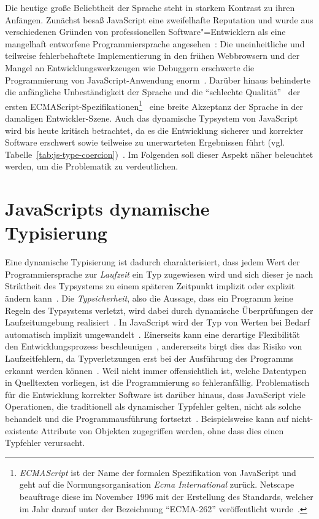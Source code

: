 Die heutige große Beliebtheit der Sprache steht in starkem Kontrast zu ihren Anfängen. Zunächst besaß JavaScript eine zweifelhafte Reputation und wurde aus verschiedenen Gründen von professionellen Software"=Entwicklern als eine mangelhaft entworfene Programmiersprache angesehen~\autocite{CROCKFORD:JS_POPULAR}: Die uneinheitliche und teilweise fehlerbehaftete Implementierung in den frühen Webbrowsern und der Mangel an Entwicklungswerkzeugen wie Debuggern erschwerte die Programmierung von JavaScript-Anwendung enorm~\autocite{OREILLY:JS_HOW_DID_WE_GET_THERE}. Darüber hinaus behinderte die anfängliche Unbeständigkeit der Sprache und die \enquote{schlechte Qualität}~\autocite{CROCKFORD:JS_MISUNDERSTOOD} der ersten ECMAScript-Spezifikationen\footnote{\textit{ECMAScript} ist der Name der formalen Spezifikation von JavaScript und geht auf die Normungsorganisation \textit{Ecma International} zurück. Netscape beauftrage diese im November 1996 mit der Erstellung des Standards, welcher im Jahr darauf unter der Bezeichnung \enquote{ECMA-262} veröffentlicht wurde~\autocite{ECMASCRIPT:1997}.}~\autocite{ECMASCRIPT:1997} eine breite Akzeptanz der Sprache in der damaligen Entwickler-Szene. Auch das dynamische Typsystem von JavaScript wird bis heute kritisch betrachtet, da es die Entwicklung sicherer und korrekter Software erschwert sowie teilweise zu unerwarteten Ergebnissen führt (vgl. Tabelle~\ref{tab:js-type-coercion})~\autocite{NIKHIL:2014,PRADEL:2015}. Im Folgenden soll dieser Aspekt näher beleuchtet werden, um die Problematik zu verdeutlichen.

\section{JavaScripts dynamische Typisierung}

Eine dynamische Typisierung ist dadurch charakterisiert, dass jedem Wert der Programmiersprache zur \emph{Laufzeit} ein Typ zugewiesen wird und sich dieser je nach Striktheit des Typsystems zu einem späteren Zeitpunkt implizit oder explizit ändern kann~\autocite[45]{WALDMANN:PPS}. Die \emph{Typsicherheit}, also die Aussage, dass ein Programm keine Regeln des Typsystems verletzt, wird dabei durch dynamische Überprüfungen der Laufzeitumgebung realisiert~\autocite[37]{CARDELLI:TYPE_SYSTEMS}. In JavaScript wird der Typ von Werten bei Bedarf automatisch implizit umgewandelt~\autocite{RICHARDS:2010}. Einerseits kann eine derartige Flexibilität den Entwicklungsprozess beschleunigen~\autocite[1]{FLOW:PAPER}, andererseits birgt dies das Risiko von Laufzeitfehlern, da Typverletzungen erst bei der Ausführung des Programms erkannt werden können~\autocite{ANDERSON:2005}. Weil nicht immer offensichtlich ist, welche Datentypen in Quelltexten vorliegen, ist die Programmierung so fehleranfällig. Problematisch für die Entwicklung korrekter Software ist darüber hinaus, dass JavaScript viele Operationen, die traditionell als dynamischer Typfehler gelten, nicht als solche behandelt und die Programmausführung fortsetzt~\autocite{NIKHIL:2014}. Beispielsweise kann auf nicht-existente Attribute von Objekten zugegriffen werden, ohne dass dies einen Typfehler verursacht.

